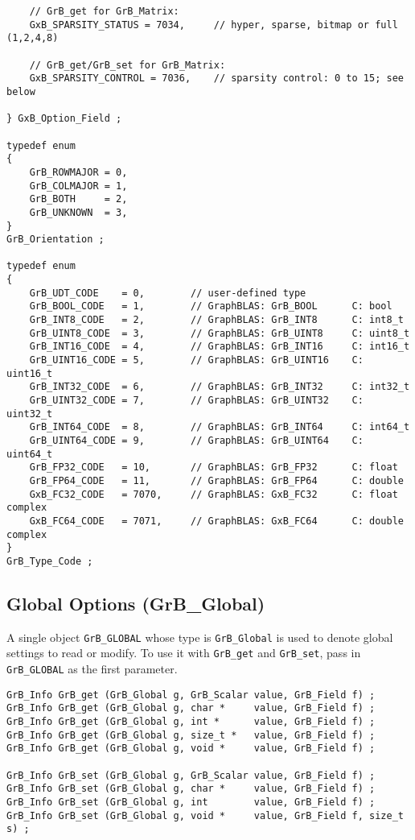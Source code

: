 {\begin{verbatim}
    // GrB_get for GrB_Matrix:
    GxB_SPARSITY_STATUS = 7034,     // hyper, sparse, bitmap or full (1,2,4,8)

    // GrB_get/GrB_set for GrB_Matrix:
    GxB_SPARSITY_CONTROL = 7036,    // sparsity control: 0 to 15; see below

} GxB_Option_Field ;

typedef enum
{
    GrB_ROWMAJOR = 0,
    GrB_COLMAJOR = 1,
    GrB_BOTH     = 2,
    GrB_UNKNOWN  = 3,
}
GrB_Orientation ;

typedef enum
{
    GrB_UDT_CODE    = 0,        // user-defined type
    GrB_BOOL_CODE   = 1,        // GraphBLAS: GrB_BOOL      C: bool
    GrB_INT8_CODE   = 2,        // GraphBLAS: GrB_INT8      C: int8_t
    GrB_UINT8_CODE  = 3,        // GraphBLAS: GrB_UINT8     C: uint8_t
    GrB_INT16_CODE  = 4,        // GraphBLAS: GrB_INT16     C: int16_t
    GrB_UINT16_CODE = 5,        // GraphBLAS: GrB_UINT16    C: uint16_t
    GrB_INT32_CODE  = 6,        // GraphBLAS: GrB_INT32     C: int32_t
    GrB_UINT32_CODE = 7,        // GraphBLAS: GrB_UINT32    C: uint32_t
    GrB_INT64_CODE  = 8,        // GraphBLAS: GrB_INT64     C: int64_t
    GrB_UINT64_CODE = 9,        // GraphBLAS: GrB_UINT64    C: uint64_t
    GrB_FP32_CODE   = 10,       // GraphBLAS: GrB_FP32      C: float
    GrB_FP64_CODE   = 11,       // GraphBLAS: GrB_FP64      C: double
    GxB_FC32_CODE   = 7070,     // GraphBLAS: GxB_FC32      C: float complex
    GxB_FC64_CODE   = 7071,     // GraphBLAS: GxB_FC64      C: double complex
}
GrB_Type_Code ; \end{verbatim}}


\subsection{Global Options ({\sf GrB\_Global})}
\label{get_set_global}

A single object \verb'GrB_GLOBAL' whose type is \verb'GrB_Global' is used to
denote global settings to read or modify.  To use it with \verb'GrB_get' and
\verb'GrB_set', pass in \verb'GrB_GLOBAL' as the first parameter.

\begin{mdframed}[userdefinedwidth=6in]
{\footnotesize
\begin{verbatim}
GrB_Info GrB_get (GrB_Global g, GrB_Scalar value, GrB_Field f) ;
GrB_Info GrB_get (GrB_Global g, char *     value, GrB_Field f) ;
GrB_Info GrB_get (GrB_Global g, int *      value, GrB_Field f) ;
GrB_Info GrB_get (GrB_Global g, size_t *   value, GrB_Field f) ;
GrB_Info GrB_get (GrB_Global g, void *     value, GrB_Field f) ;

GrB_Info GrB_set (GrB_Global g, GrB_Scalar value, GrB_Field f) ;
GrB_Info GrB_set (GrB_Global g, char *     value, GrB_Field f) ;
GrB_Info GrB_set (GrB_Global g, int        value, GrB_Field f) ;
GrB_Info GrB_set (GrB_Global g, void *     value, GrB_Field f, size_t s) ;
\end{verbatim}
}\end{mdframed}


